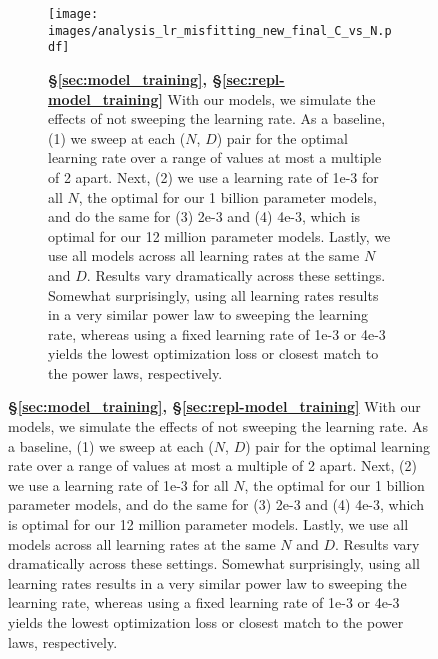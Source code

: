 \begin{figure}[]
\ContinuedFloat 
\begin{subfigure}{\textwidth}
    \centering
    
    \texttt{[image: images/analysis\_lr\_misfitting\_new\_final\_C\_vs\_N.pdf]}

    \caption{\textbf{\S\ref{sec:model_training}, \S\ref{sec:repl-model_training}} With our models, we simulate the effects of not sweeping the learning rate. As a baseline, (1) we sweep at each ($N$, $D$) pair for the optimal learning rate over a range of values at most a multiple of 2 apart. Next, (2) we use a learning rate of 1e-3 for all $N$, the optimal for our 1 billion parameter models, and do the same for (3) 2e-3 and (4) 4e-3, which is optimal for our 12 million parameter models. Lastly, we use all models across all learning rates at the same $N$ and $D$. Results vary dramatically across these settings. Somewhat surprisingly, using all learning rates results in a very similar power law to sweeping the learning rate, whereas using a fixed learning rate of 1e-3 or 4e-3 yields the lowest optimization loss or closest match to the \citet{hoffmann2022training} power laws, respectively.}
    \label{fig:analysis_lr_ours}
\end{subfigure}

\end{figure}
